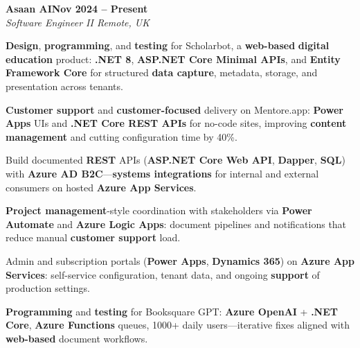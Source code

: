 \documentclass[letterpaper,10pt]{article}
\newcommand{\headingBf}[2]{
  \hspace{10pt}\textbf{#1}\hfill\textbf{#2}\\
}
\newcommand{\headingIt}[2]{
  \hspace{10pt}\textit{#1}\hfill\textit{#2}\\
}
\newenvironment{resume_list}{
  \vspace{-7pt}
  \begin{itemize}[itemsep=-2px, parsep=1pt, leftmargin=30pt]
}{
  \end{itemize}
}
\begin{document}
\headingBf{Asaan AI}{Nov 2024 -- Present}
\headingIt{Software Engineer II \hfill Remote, UK}{}
\begin{resume_list}
    \item \textbf{Design}, \textbf{programming}, and \textbf{testing} for Scholarbot, a \textbf{web-based} \textbf{digital education} product: \textbf{.NET 8}, \textbf{ASP.NET Core Minimal APIs}, and \textbf{Entity Framework Core} for structured \textbf{data capture}, metadata, storage, and presentation across tenants.
    \item \textbf{Customer support} and \textbf{customer-focused} delivery on Mentore.app: \textbf{Power Apps} UIs and \textbf{.NET Core REST APIs} for no-code sites, improving \textbf{content management} and cutting configuration time by 40\%.
    \item Build documented \textbf{REST} APIs (\textbf{ASP.NET Core Web API}, \textbf{Dapper}, \textbf{SQL}) with \textbf{Azure AD B2C}---\textbf{systems integrations} for internal and external consumers on hosted \textbf{Azure App Services}.
    \item \textbf{Project management}-style coordination with stakeholders via \textbf{Power Automate} and \textbf{Azure Logic Apps}: document pipelines and notifications that reduce manual \textbf{customer support} load.
    \item Admin and subscription portals (\textbf{Power Apps}, \textbf{Dynamics 365}) on \textbf{Azure App Services}: self-service configuration, tenant data, and ongoing \textbf{support} of production settings.
    \item \textbf{Programming} and \textbf{testing} for Booksquare GPT: \textbf{Azure OpenAI} + \textbf{.NET Core}, \textbf{Azure Functions} queues, 1000+ daily users---iterative fixes aligned with \textbf{web-based} document workflows.
\end{resume_list}
\end{document}
